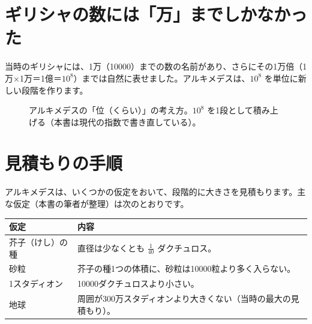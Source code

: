 \documentclass[a4paper,11pt,openany]{ltjsbook}
\begin{document}
\section{ギリシャの数には「万」までしかなかった}

当時のギリシャには、1万（10000）までの数の名前があり、さらにその1万倍（1万×1万＝1億＝$10^8$）までは自然に表せました。アルキメデスは、$10^8$ を単位に新しい段階を作ります。

\begin{figure}[htbp]
\centering
{}
\caption{アルキメデスの「位（くらい）」の考え方。$10^8$ を1段として積み上げる（本書は現代の指数で書き直している）。}
\end{figure}

\section{見積もりの手順}

アルキメデスは、いくつかの仮定をおいて、段階的に大きさを見積もります。主な仮定（本書の筆者が整理）は次のとおりです。

\begin{center}
\begin{tabular}{lp{7.5cm}}
\toprule
仮定 & 内容\\
\midrule
芥子（けし）の種 & 直径は少なくとも $\frac{1}{40}$ ダクチュロス。\\
砂粒 & 芥子の種1つの体積に、砂粒は10000粒より多く入らない。\\
1スタディオン & 10000ダクチュロスより小さい。\\
地球 & 周囲が300万スタディオンより大きくない（当時の最大の見積もり）。\\
\bottomrule
\end{tabular}
\end{center}
\end{document}
